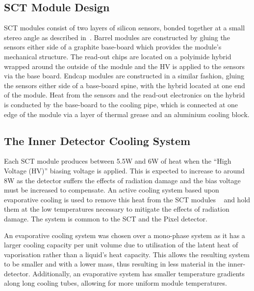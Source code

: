 
\subsection{SCT Module Design}

SCT modules consist of two layers of silicon sensors, bonded together at a small
stereo angle as described in~. Barrel modules are constructed
by gluing the sensors either side of a graphite base-board
which provides the module's mechanical structure. The read-out chips are located on a
polyimide hybrid wrapped around the outside of the module and the HV is applied
to the sensors via the base board. Endcap modules are constructed in a similar
fashion, gluing the sensors either side of a base-board spine, with the hybrid
located at one end of the module.  
Heat from the sensors and the read-out electronics on the hybrid is conducted by
the base-board to the cooling pipe, which is connected at one edge of the module
via a layer of thermal grease and an aluminium cooling block.

\subsection{The Inner Detector Cooling System}
\label{sec:SCT-CoolingDesc}
Each SCT module produces between 5.5W and 6W of heat when the ``High
Voltage (HV)'' biasing voltage is applied. This is expected
to increase to around 8W as the detector suffers the effects of radiation
damage and the bias voltage must be increased to compensate. 
An active cooling system based upon
evaporative cooling is used to remove this heat from the SCT modules
~\cite{1748-0221-3-07-P07003} and hold them at the low temperatures necessary to
mitigate the effects of radiation damage. The system is common to the SCT and
the Pixel detector. 

An evaporative cooling system was chosen over a mono-phase system as it has a
larger cooling capacity per unit volume due to utilisation of the latent heat of
vaporisation rather than a liquid's heat capacity. This allows the resulting
system to be smaller and with a lower mass, thus resulting in less material in
the inner-detector. Additionally, an evaporative system has
smaller temperature gradients along long cooling tubes, allowing for more
uniform module temperatures.

